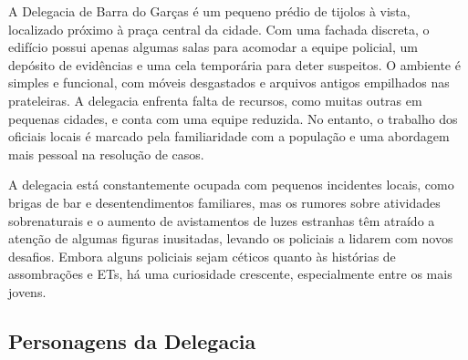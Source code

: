 A Delegacia de Barra do Garças é um pequeno prédio de tijolos à vista, localizado próximo à praça central da cidade. Com uma fachada discreta, o edifício possui apenas algumas salas para acomodar a equipe policial, um depósito de evidências e uma cela temporária para deter suspeitos. O ambiente é simples e funcional, com móveis desgastados e arquivos antigos empilhados nas prateleiras. A delegacia enfrenta falta de recursos, como muitas outras em pequenas cidades, e conta com uma equipe reduzida. No entanto, o trabalho dos oficiais locais é marcado pela familiaridade com a população e uma abordagem mais pessoal na resolução de casos.

A delegacia está constantemente ocupada com pequenos incidentes locais, como brigas de bar e desentendimentos familiares, mas os rumores sobre atividades sobrenaturais e o aumento de avistamentos de luzes estranhas têm atraído a atenção de algumas figuras inusitadas, levando os policiais a lidarem com novos desafios. Embora alguns policiais sejam céticos quanto às histórias de assombrações e ETs, há uma curiosidade crescente, especialmente entre os mais jovens.

\subsection{Personagens da Delegacia}

